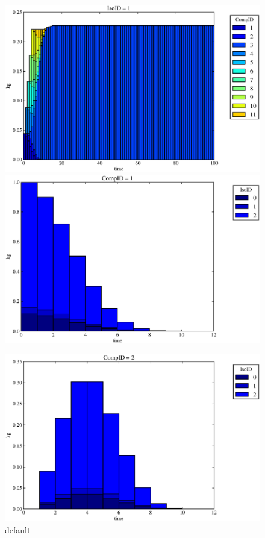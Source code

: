 \begin{figure}[ht]
\begin{minipage}[b]{0.45\linewidth}
\centering
\includegraphics[width=\textwidth]{./chapters/demonstration/no_release/buff0deg.eps}
\includegraphics[width=\textwidth]{./chapters/demonstration/no_release/buff0deg1.eps}
\caption{default}
\label{fig:figure1}
\end{minipage}
\hspace{0.5cm}
\begin{minipage}[b]{0.45\linewidth}
\centering
\includegraphics[width=\textwidth]{./chapters/demonstration/no_release/buff0deg2.eps}

\end{minipage}
\end{figure}
